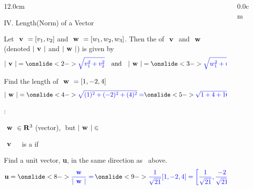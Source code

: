 \begin{frame}
\begin{columns}
\begin{column}{12.0cm}

{IV. Length(Norm) of a Vector}

\vspace{0.2cm}

\scriptsize

\DEF Let $\textbf{ v } = [v_1,v_2]$ and $\textbf{ w } = [w_1,w_2,w_3]$.  Then the  of $\textbf{ v }$ and $\textbf{ w }$ (denoted $|\textbf{ v }|$ and $|\textbf{ w }|$) is given by
\begin{align*}
	|\V| = \ON<2->{\B{\sqrt{v_1^2 + v_2^2}}} \quad \text{and} \quad |\W| = \ON<3->{\B{\sqrt{w_1^2 + w_2^2 + w_3^2}}}
\end{align*}

\EX Find the length of $\textbf{ w } = [1,-2,4]$
\begin{align*}
	|\W| = \ON<4->{\B{\sqrt{(1)^2 + (-2)^2 + (4)^2} =}} \ON<5->{\B{\sqrt{1+4+16} = \sqrt{21}}}
\end{align*}

:

\vspace{0.1cm}

\OBUL $\textbf{ w } \in \mathbf{R}^3$ (vector),\,\, but $|\textbf{ w }| \in $ \\

\vspace{0.4cm}

\DEF $\textbf{ v }$ \,\,\, is a  if \,\,\, 

\vspace{0.4cm}

\EX Find a unit vector, {\bf u}, in the same direction as \W \, above.
\begin{align*}
	{\bf u} = \ON<8->{\B{\frac{\W}{|\W|} =\,}} \ON<9->{\B{\frac{1}{\sqrt{21}}[1,-2,4] = \left[\frac{1}{\sqrt{21}},\frac{-2}{\sqrt{21}},\frac{4}{\sqrt{21}}\right]}} \\
\end{align*}

\end{column}
\begin{column}{0.0cm}\end{column}
\end{columns}
\end{frame}

